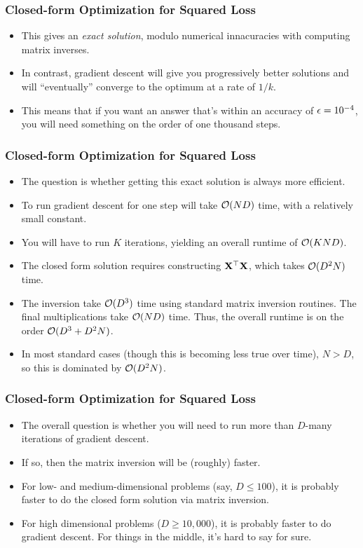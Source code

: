 \documentclass[trans]{beamer}
\begin{document}
\begin{frame}
  \frametitle{Closed-form Optimization for Squared Loss}
\begin{itemize}
\item This gives an \emph{exact solution}, modulo numerical
innacuracies with computing matrix inverses. 
\item In contrast, gradient
descent will give you progressively better solutions and will
``eventually'' converge to the optimum at a rate of $1/k$.  
\item This means
that if you want an answer that's within an accuracy of $\epsilon =
10^{-4}$, you will need something on the order of one thousand steps.
\end{itemize}
\end{frame}

\begin{frame}
  \frametitle{Closed-form Optimization for Squared Loss}
\begin{itemize}
\item 
The question is whether getting this exact solution is always more
efficient.
\item  To run gradient descent for one step will take $\mathcal{O}(ND)$
time, with a relatively small constant.
\item  You will have to run $K$
iterations, yielding an overall runtime of $\mathcal{O}(KND)$.  
\item The closed form solution requires constructing $\text{\bf X}{}^\top\text{\bf X}$,
which takes $\mathcal{O}(D^2 N)$ time. 
\item The inversion take $\mathcal{O}(D^3)$ time
using standard matrix inversion routines.  The final multiplications
take $\mathcal{O}(ND)$ time.  Thus, the overall runtime is on the order
$\mathcal{O}(D^3 + D^2 N)$.  
\item In most standard cases (though this is becoming
less true over time), $N > D$, so this is dominated by $\mathcal{O}(D^2 N)$.
\end{itemize}
\end{frame}

\begin{frame}
  \frametitle{Closed-form Optimization for Squared Loss}
\begin{itemize}
\item 
The overall question is whether you will need to run more than
$D$-many iterations of gradient descent.  
\item If so, then the matrix
inversion will be (roughly) faster.
\item For low- and medium-dimensional problems (say,
$D \leq 100$), it is probably faster to do the closed form solution
via matrix inversion. 
\item  For high dimensional problems ($D \geq
10,000$), it is probably faster to do gradient descent.  For things in
the middle, it's hard to say for sure.
\end{itemize}
\end{frame}
\end{document}
